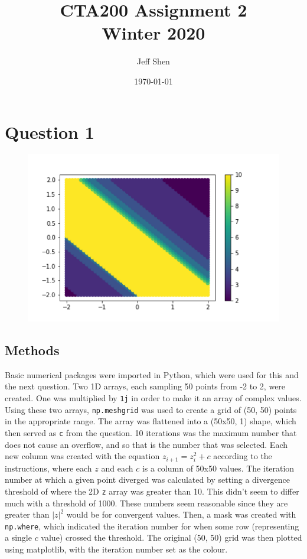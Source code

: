 \documentclass{article}
\newcommand{\code}[1]{\texttt{#1}}
\begin{document}
\title{%
	CTA200 Assignment 2 \\[0.3cm]
	\large Winter 2020}
\author{Jeff Shen}
\date{\today}

\maketitle

\section*{Question 1}

\begin{figure}[!htbp]
	\centering
	\includegraphics[width=0.8\linewidth]{q1.png}
\end{figure}

\subsection*{Methods}

Basic numerical packages were imported in Python, which were used for this and the next question. Two 1D arrays, each sampling 50 points from -2 to 2, were created. One was multiplied by \code{1j} in order to make it an array of complex values. Using these two arrays, \code{np.meshgrid} was used to create a grid of (50, 50) points in the appropriate range. The array was flattened into a (50x50, 1) shape, which then served as \code{c} from the question. 10 iterations was the maximum number that does not cause an overflow, and so that is the number that was selected. Each new column was created with the equation $z_{i+1} = z_i^2 + c$ according to the instructions, where each $z$ and each $c$ is a column of 50x50 values. The iteration number at which a given point diverged was calculated by setting a divergence threshold of where the 2D \code{z} array was greater than 10. This didn't seem to differ much with a threshold of 1000. These numbers seem reasonable since they are greater than $|z|^2$ would be for convergent values. Then, a mask was created with \code{np.where}, which indicated the iteration number for when some row (representing a single $c$ value) crossed the threshold. The original (50, 50) grid was then plotted using matplotlib, with the iteration number set as the colour. 
\end{document}
